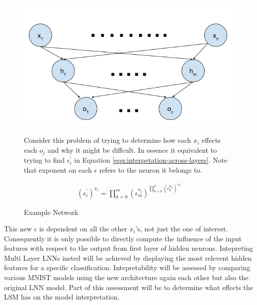\begin{figure}[H]
	\centering
	\begin{minipage}[t]{0.5\textwidth}
		\vspace{0px}
		\includegraphics[width=\textwidth]{NetworkExample.png}
		\caption{Example Network}
		\label{fig:network-example}
	\end{minipage}
	\hspace{1px}
	\begin{minipage}[t]{0.45\textwidth}
		\vspace{2px}
	Consider this problem of trying to determine how each $x_i$ effects each $o_j$ and why it might be diffcult. In essence it equivalent to trying to find $\epsilon^{'}_i$ in Equation \ref{equ:interpetation-across-layers}. Note that exponent on each $\epsilon$ refers to the neuron it belongs to.

		\begin{align}
			(\epsilon^{'}_i)^{x_i} = \prod_{k = 0}^{m} (\epsilon^{o_j}_m)^{\prod_{b = 0}^{n} (\epsilon^{h_k}_b)^{x_b}}
			\label{equ:interpetation-across-layers}
		\end{align}
	\end{minipage}
	\hfill
\end{figure}

This new $\epsilon$ is dependent on all the other $x_i$'s, not just the one of interest. Consequently it is only possible to directly compute the influence of the input features with respect to the output from first layer of hidden neurons. Intepreting Multi Layer LNNs insted will be achieved by displaying the most relevent hidden features for a specific classification. Intepretability will be assessed by comparing various MNIST models using the new architecture again each other but also the original LNN model. Part of this assessment will be to determine what effects the LSM has on the model interpretation.


